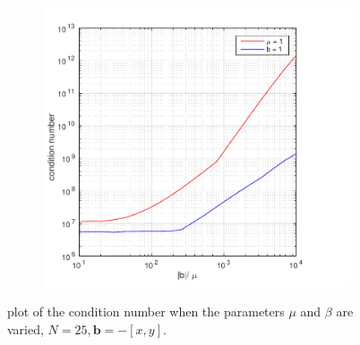 \begin{figure}[h!]
\begin{subfigure}[b]{0.48\textwidth}
		\includegraphics[width=\textwidth]{Figures/Spec-LS_difftrans_ConditionNumber.pdf}
  \end{subfigure}
  \vspace{-0.1\baselineskip}
	\caption{plot of the condition number when the parameters $\mu$ and $\beta$ are varied, $N=25,\mathbf{b} = -[x,y]$.}
  \label{fig:CondDifftransSpec}
\end{figure}
%
%
